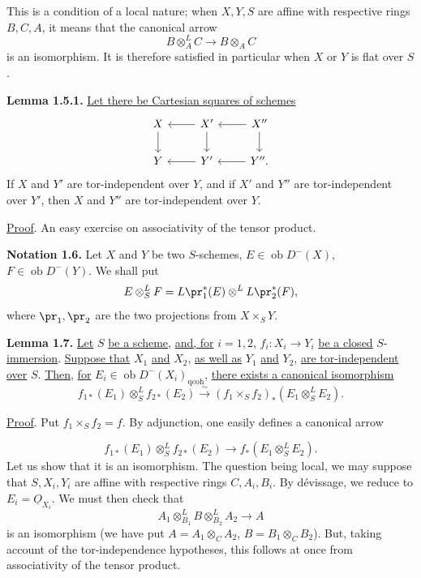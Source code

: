 This is a condition of a local nature; when \(X,Y,S\) are affine with respective rings \(B,C,A\), it means that the canonical arrow
\[
  B\otimes_A^{L}C\longrightarrow B\otimes_A C
\]
is an isomorphism. It is therefore satisfied in particular when \(X\) or \(Y\) is flat over \(S\).

\textbf{Lemma 1.5.1.} \uline{Let there be Cartesian squares of schemes}
\[
\begin{tikzcd}
X \arrow[d] & X' \arrow[l] \arrow[d] & X'' \arrow[l] \arrow[d]\\
Y & Y' \arrow[l] & Y'' \arrow[l].
\end{tikzcd}
\]
If \(X\) and \(Y'\) are tor-independent over \(Y\), and if \(X'\) and \(Y''\) are tor-independent over \(Y'\), then \(X\) and \(Y''\) are tor-independent over \(Y\).

\uline{Proof}. An easy exercise on associativity of the tensor product.

\textbf{Notation 1.6.} Let \(X\) and \(Y\) be two \(S\)-schemes, \(E\in\operatorname{ob} D^{-}(X)\), \(F\in\operatorname{ob} D^{-}(Y)\). We shall put
\[
  E\otimes_S^{L}F
  =
  L\pr_1^*(E)\otimes^{L}L\pr_2^*(F),
\]
where \(\pr_1,\pr_2\) are the two projections from \(X\times_SY\).

\textbf{Lemma 1.7.} \uline{Let} \(S\) \uline{be a scheme}, \uline{and, for} \(i=1,2\), \(f_i:X_i\longrightarrow Y_i\) \uline{be a closed} \(S\)-\uline{immersion}. \uline{Suppose that} \(X_1\) \uline{and} \(X_2\), \uline{as well as} \(Y_1\) \uline{and} \(Y_2\), \uline{are tor-independent over} \(S\). \uline{Then}, \uline{for} \(E_i\in\operatorname{ob} D^{-}(X_i)_{\mathrm{qcoh}}\), \uline{there exists a canonical isomorphism}
\[
  f_{1*}(E_1)\otimes_S^{L}f_{2*}(E_2)
  \xrightarrow{\sim}
  (f_1\times_Sf_2)_*(E_1\otimes_S^{L}E_2).
\]

\uline{Proof}. Put \(f_1\times_Sf_2=f\). By adjunction, one easily defines a canonical arrow

\[
  f_{1*}(E_1)\otimes_S^{L}f_{2*}(E_2)
  \longrightarrow
  f_*(E_1\otimes_S^{L}E_2).
\]
Let us show that it is an isomorphism. The question being local, we may suppose that \(S,X_i,Y_i\) are affine with respective rings \(C,A_i,B_i\). By dévissage, we reduce to \(E_i=\underline{O}_{X_i}\). We must then check that
\[
  A_1\otimes_{B_1}^{L}B\otimes_{B_2}^{L}A_2
  \longrightarrow A
\]
is an isomorphism (we have put \(A=A_1\otimes_C A_2\), \(B=B_1\otimes_C B_2\)). But, taking account of the tor-independence hypotheses, this follows at once from associativity of the tensor product.

